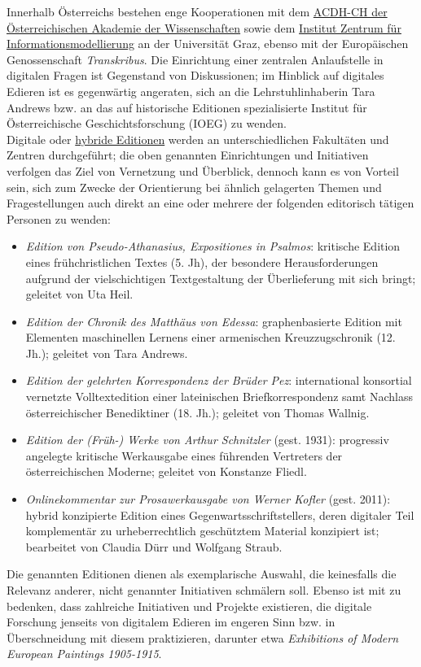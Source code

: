 \documentclass{article}
\begin{document}
        Innerhalb Österreichs bestehen enge Kooperationen mit dem \href{http://gams.uni-graz.at/o:konde.1}{ACDH-CH der Österreichischen Akademie der Wissenschaften} sowie dem \href{http://gams.uni-graz.at/o:konde.217}{Institut Zentrum für Informationsmodellierung} an der Universität Graz, ebenso mit der Europäischen Genossenschaft \emph{Transkribus}. Die Einrichtung einer zentralen Anlaufstelle in digitalen Fragen ist Gegenstand von Diskussionen; im Hinblick auf digitales Edieren ist es gegenwärtig angeraten, sich an die Lehrstuhlinhaberin Tara Andrews bzw. an das auf historische Editionen spezialisierte Institut für Österreichische Geschichtsforschung (IOEG) zu wenden.\\
            
        Digitale oder \href{http://gams.uni-graz.at/o:konde.96}{hybride Editionen} werden an unterschiedlichen Fakultäten und Zentren durchgeführt; die oben genannten Einrichtungen und Initiativen verfolgen das Ziel von Vernetzung und Überblick, dennoch kann es von Vorteil sein, sich zum Zwecke der Orientierung bei ähnlich gelagerten Themen und Fragestellungen auch direkt an eine oder mehrere der folgenden editorisch tätigen Personen zu wenden:\\
            
        \begin{itemize}\item {\emph{Edition von Pseudo-Athanasius, Expositiones in Psalmos}: kritische Edition eines frühchristlichen Textes (5. Jh), der besondere Herausforderungen aufgrund der vielschichtigen Textgestaltung der Überlieferung mit sich bringt; geleitet von Uta Heil.}\item {\emph{Edition der Chronik des Matthäus von Edessa}: graphenbasierte Edition mit Elementen maschinellen Lernens einer armenischen Kreuzzugschronik (12. Jh.); geleitet von Tara Andrews.}\item {\emph{Edition der gelehrten Korrespondenz der Brüder Pez}: international konsortial vernetzte Volltextedition einer lateinischen Briefkorrespondenz samt Nachlass österreichischer Benediktiner (18. Jh.); geleitet von Thomas Wallnig.}\item {\emph{Edition der (Früh-) Werke von Arthur Schnitzler} (gest. 1931): progressiv angelegte kritische Werkausgabe eines führenden Vertreters der österreichischen Moderne; geleitet von Konstanze Fliedl.}\item {\emph{Onlinekommentar zur Prosawerkausgabe von Werner Kofler} (gest. 2011): hybrid konzipierte Edition eines Gegenwartsschriftstellers, deren digitaler Teil komplementär zu urheberrechtlich geschütztem Material konzipiert ist; bearbeitet von Claudia Dürr und Wolfgang Straub.}\end{itemize}Die genannten Editionen dienen als exemplarische Auswahl, die keinesfalls die Relevanz anderer, nicht genannter Initiativen schmälern soll. Ebenso ist mit zu bedenken, dass zahlreiche Initiativen und Projekte existieren, die digitale Forschung jenseits von digitalem Edieren im engeren Sinn bzw. in Überschneidung mit diesem praktizieren, darunter etwa \emph{Exhibitions of Modern European Paintings 1905-1915}.\\
            
\end{document}
